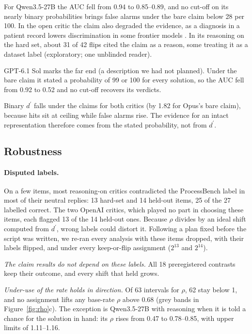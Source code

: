 \documentclass[letterpaper]{article} %
\newcommand{\dprime}{d^{\prime}}
\begin{document}
For Qwen3.5-27B the AUC fell from 0.94 to 0.85--0.89, and no cut-off on its nearly binary probabilities brings false alarms under the bare claim below 28 per 100. In the open critic the claim also degraded the evidence, as a diagnosis in a patient record lowers discrimination in some frontier models \citep{rosenblum2026record}. In its reasoning on the hard set, about 31 of 42 flips cited the claim as a reason, some treating it as a dataset label (exploratory; one unblinded reader).

GPT-6.1 Sol marks the far end (a description we had not planned). Under the bare claim it stated a probability of 99 or 100 for every solution, so the AUC fell from 0.92 to 0.52 and no cut-off recovers its verdicts.

Binary $\dprime$ falls under the claims for both critics (by 1.82 for Opus's bare claim), because hits sit at ceiling while false alarms rise. The evidence for an intact representation therefore comes from the stated probability, not from $\dprime$.

\subsection{Robustness}
\label{sec:robust}

\paragraph{Disputed labels.} On a few items, most reasoning-on critics contradicted the ProcessBench label in most of their neutral replies: 13 hard-set and 14 held-out items, 25 of the 27 labelled correct. The two OpenAI critics, which played no part in choosing these items, each flagged 13 of the 14 held-out ones. Because $\rho$ divides by an ideal shift computed from $\dprime$, wrong labels could distort it. Following a plan fixed before the script was written, we re-ran every analysis with these items dropped, with their labels flipped, and under every keep-or-flip assignment ($2^{13}$ and $2^{14}$).

\emph{The claim results do not depend on these labels.} All 18 preregistered contrasts keep their outcome, and every shift that held grows.

\emph{Under-use of the rate holds in direction.} Of 63 intervals for $\rho$, 62 stay below 1, and no assignment lifts any base-rate $\rho$ above 0.68 (grey bands in Figure~\ref{fig:rho}c). The exception is Qwen3.5-27B with reasoning when it is told a chance for the solution in hand: its $\rho$ rises from 0.47 to 0.78--0.85, with upper limits of 1.11--1.16.
\end{document}
